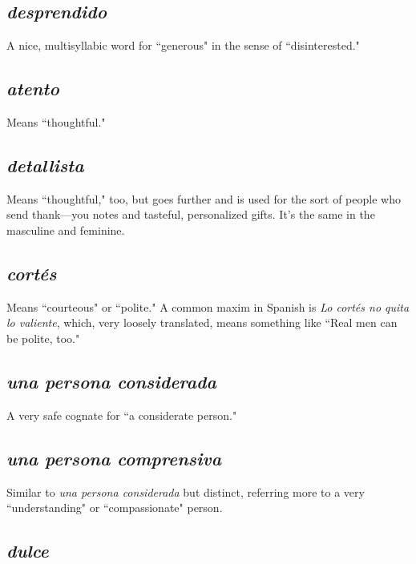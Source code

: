 \subsection{\emph{desprendido}}

A nice, multisyllabic word for ``generous" in
the sense of ``disinterested."

\subsection{\emph{atento}}

Means ``thoughtful."

\subsection{\emph{detallista}}

Means ``thoughtful," too, but goes further and is
used for the sort of people who send thank---you notes and tasteful, personalized gifts. It's the same in the masculine and feminine.

\subsection{\emph{cortés}}

Means ``courteous" or ``polite." A common maxim
in Spanish is \emph{Lo cortés no quita lo valiente}, which, very loosely translated, means something like ``Real men can be polite, too."

\subsection{\emph{una persona considerada}}

A very safe cognate for ``a considerate person."

\subsection{\emph{una persona comprensiva}}

Similar to \emph{una persona considerada} but distinct, referring more to a very ``understanding" or ``compassionate" person.

\subsection{\emph{dulce}}


